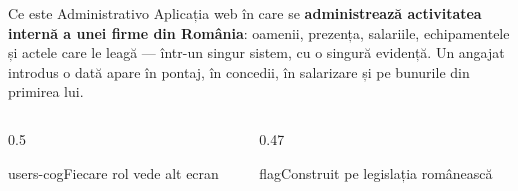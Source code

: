 \documentclass[aspectratio=169,11pt,t,xcolor={table}]{beamer}
\begin{document}
\begin{frame}{Ce este Administrativo}
  \vspace{0pt}%
  {\footnotesize
  Aplicația web în care se \textbf{administrează activitatea internă a unei firme din
  România}: oamenii, prezența, salariile, echipamentele și actele care le leagă —
  într-un singur sistem, cu o singură evidență. Un angajat introdus o dată apare în
  pontaj, în concedii, în salarizare și pe bunurile din primirea lui.}
  \vspace{5pt}
  \begin{columns}[T,onlytextwidth]
    \begin{column}{0.5\textwidth}
      \begin{card}[brandBlue]{users-cog}{Fiecare rol vede alt ecran}
        \footnotesize
        \par\vspace{1pt}
        \par\vspace{1pt}
        \par\vspace{1pt}
      \end{card}
    \end{column}
    \begin{column}{0.47\textwidth}
      \begin{card}[brandTeal]{flag}{Construit pe legislația românească}
        \footnotesize
        \par\vspace{2pt}
        \par\vspace{2pt}
        \par\vspace{2pt}
      \end{card}
    \end{column}
  \end{columns}
  \vspace{5pt}
  \par\noindent
  \hfill
  \hfill
  \hfill
\end{frame}
\end{document}
